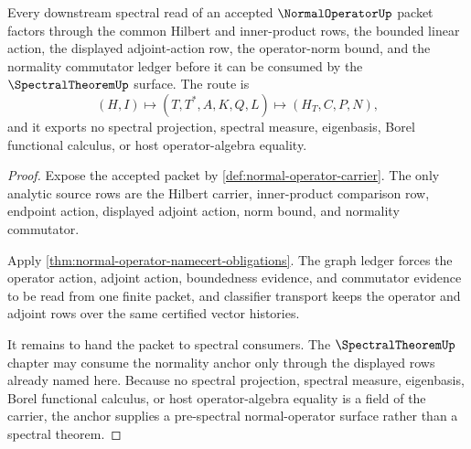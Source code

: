 \begin{theorem}
\label{thm:normal-operator-innerproduct-spectral-anchor}
Every downstream spectral read of an accepted $\NormalOperatorUp$ packet factors through the common Hilbert and inner-product rows, the bounded linear action, the displayed adjoint-action row, the operator-norm bound, and the normality commutator ledger before it can be consumed by the $\SpectralTheoremUp$ surface. The route is
$$
(H,I) \longmapsto (T,T^\ast,A,K,Q,L) \longmapsto (H_T,C,P,N),
$$
and it exports no spectral projection, spectral measure, eigenbasis, Borel functional calculus, or host operator-algebra equality.
\end{theorem}
\begin{proof}
Expose the accepted packet by \autoref{def:normal-operator-carrier}. The only analytic source rows are the Hilbert carrier, inner-product comparison row, endpoint action, displayed adjoint action, norm bound, and normality commutator.

Apply \autoref{thm:normal-operator-namecert-obligations}. The graph ledger forces the operator action, adjoint action, boundedness evidence, and commutator evidence to be read from one finite packet, and classifier transport keeps the operator and adjoint rows over the same certified vector histories.

It remains to hand the packet to spectral consumers. The $\SpectralTheoremUp$ chapter may consume the normality anchor only through the displayed rows already named here. Because no spectral projection, spectral measure, eigenbasis, Borel functional calculus, or host operator-algebra equality is a field of the carrier, the anchor supplies a pre-spectral normal-operator surface rather than a spectral theorem.
\end{proof}


\begin{closurestatus}{\NormalOperatorUp}
  \theoryclosure{\seedClosure}
  \formalstatus{\unformalizedV}
\end{closurestatus}
